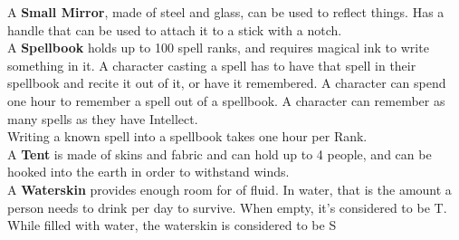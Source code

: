 A \textbf{Small Mirror}, made of steel and glass, can be used to reflect things.
Has a handle that can be used to attach it to a stick with a notch.\\

A \textbf{Spellbook} holds up to 100 spell ranks, and requires magical ink to write something in it.
A character casting a spell has to have that spell in their spellbook and recite it out of it, or have it remembered.
A character can spend one hour to remember a spell out of a spellbook.
A character can remember as many spells as they have Intellect.\\
Writing a known spell into a spellbook takes one hour per Rank.\\

A \textbf{Tent} is made of skins and fabric and can hold up to 4 people, and can be hooked into the earth in order to withstand winds.\\

A \textbf{Waterskin} provides enough room for  of fluid.
In water, that is the amount a person needs to drink per day to survive.
When empty, it's considered to be T.
While filled with water, the waterskin is considered to be S\\